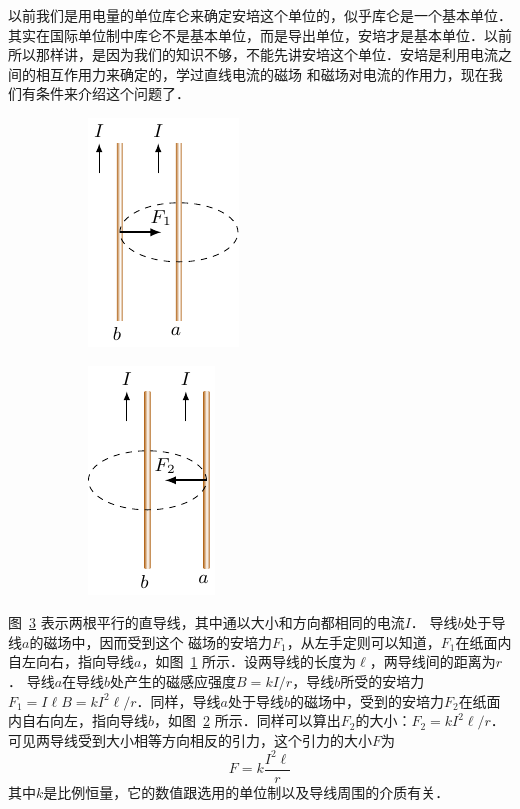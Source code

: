 以前我们是用电量的单位库仑来确定安培这个单位的，似乎库仑是一个基本单位．其实在国际单位制中库仑不是基本单位，而是导出单位，安培才是基本单位．以前所以那样讲，是因为我们的知识不够，不能先讲安培这个单位．安培是利用电流之间的相互作用力来确定的，学过直线电流的磁场
和磁场对电流的作用力，现在我们有条件来介绍这个问题了．
\begin{figure}[htbp]
    \centering
    \begin{subfigure}{0.4\linewidth}
        \centering
        \includegraphics{fig/C/1-23a.pdf}
        \caption{}\label{fig_C_1-23a}
    \end{subfigure}
    \hfil
    \begin{subfigure}{0.4\linewidth}
        \centering
        \includegraphics{fig/C/1-23b.pdf}
        \caption{}\label{fig_C_1-23b}
    \end{subfigure}
    \caption{}\label{fig_C_1-23}
\end{figure}

图~\ref{fig_C_1-23} 表示两根平行的直导线，其中通以大小和方向都相同的电流$I$．
导线$b$处于导线$a$的磁场中，因而受到这个
磁场的安培力$F_1$，从左手定则可以知道，$F_1$在纸面内自左向右，指向导线$a$，如图~\ref{fig_C_1-23a} 所示．设两导线的长度为$\ell$，两导线间的距离为$r$．
导线$a$在导线$b$处产生的磁感应强度$B=kI/r$，导线$b$所受的安培力$F_1=I\ell B=kI^2\ell/r$．同样，导线$a$处于导线$b$的磁场中，受到的安培力$F_2$在纸面内自右向左，指向导线$b$，如图~\ref{fig_C_1-23b} 所示．同样可以算出$F_2$的大小：$F_2=kI^2\ell/r$．可见两导线受到大小相等方向相反的引力，这个引力的大小$F$为
\[F=k\frac{I^2\ell}{r}\]
其中$k$是比例恒量，它的数值跟选用的单位制以及导线周围的介质有关．

